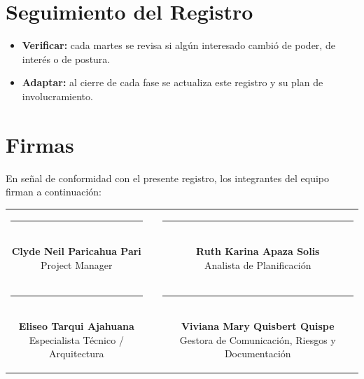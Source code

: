 \documentclass[11pt,a4paper]{article}
\begin{document}
\section{Seguimiento del Registro}
\begin{itemize}[leftmargin=*]
    \item \textbf{Verificar:} cada martes se revisa si algún interesado cambió de poder, de interés o de postura.
    \item \textbf{Adaptar:} al cierre de cada fase se actualiza este registro y su plan de involucramiento.
\end{itemize}

\section{Firmas}
\noindent En señal de conformidad con el presente registro, los integrantes del equipo firman a continuación:

\vspace{1.5cm}
\begin{center}
\begin{tabular}{c c c}
    \parbox{6.5cm}{\centering \rule{6.0cm}{0.6pt}\\[5pt] \textbf{Clyde Neil Paricahua Pari}\\[2pt] {\footnotesize Project Manager}}
    & \hspace{0.8cm} &
    \parbox{6.5cm}{\centering \rule{6.0cm}{0.6pt}\\[5pt] \textbf{Ruth Karina Apaza Solis}\\[2pt] {\footnotesize Analista de Planificación}}
    \\[2.0cm]
    \parbox{6.5cm}{\centering \rule{6.0cm}{0.6pt}\\[5pt] \textbf{Eliseo Tarqui Ajahuana}\\[2pt] {\footnotesize Especialista Técnico / Arquitectura}}
    & \hspace{0.8cm} &
    \parbox{6.5cm}{\centering \rule{6.0cm}{0.6pt}\\[5pt] \textbf{Viviana Mary Quisbert Quispe}\\[2pt] {\footnotesize Gestora de Comunicación, Riesgos y Documentación}}
\end{tabular}
\end{center}
\end{document}

